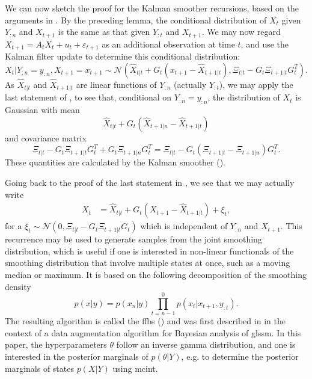 We can now sketch the proof for the Kalman smoother recursions, based on the arguments in \citep[Chapter 7.3]{Chopin2020Introduction}. By the preceding lemma, the conditional distribution of $X_{t}$ given $Y_{:n}$ and $X_{t + 1}$ is the same as that given $Y_{:t}$ and $X_{t + 1}$. 
We may now regard $X_{t + 1} = A_{t}X_{t} + u_{t} + \varepsilon_{t + 1}$ as an additional observation at time $t$, and use the Kalman filter update to determine this conditional distribution:
$$
X_{t} | Y_{:n} = y_{:n}, X_{t + 1} = x_{t+1}\sim \mathcal N \left(\hat X_{t|t} + G_{t}(x_{t + 1} - \hat X_{t + 1 | t}), \Xi_{t |t} - G_{t} \Xi_{t + 1 | t} G_{t}^{T} \right).
$$
As $\hat X_{t|t}$ and $\hat X_{t+1|t}$ are linear functions of $Y_{:n}$ (actually $Y_{:t}$), we may apply the last statement of , to see that, conditional on $Y_{:n} = y_{:n}$, the distribution of $X_{t}$ is Gaussian with mean
$$
\hat X_{t|t} + G_{t} \left( \hat X_{t + 1 | n} - \hat X_{t + 1 | t} \right)
$$
and covariance matrix 
$$
\Xi_{t | t} - G_{t} \Xi_{t + 1|t} G_{t}^{T} + G_{t} \Xi_{t + 1 | n} G_{t}^{T} = \Xi_{t|t} - G_{t} \left( \Xi_{t + 1 | t} - \Xi_{t + 1 | n} \right)G_{t} ^{T}.
$$
These quantities are calculated by the Kalman smoother ().

Going back to the proof of the last statement in , we see that we may actually write
\begin{align}
    \label{eq:kalman-smoother-backwards-recursion}
    X_{t} &= \hat X_{t|t} + G_{t}(X_{t + 1} - \hat X_{t + 1 | t}) + \xi_{t},
\end{align}
for a $\xi_{t} \sim \mathcal N \left( 0, \Xi_{t | t} - G_{t} \Xi_{t + 1|t}G_{t} \right)$ which is independent of $Y_{:n}$ and $X_{t + 1}$.
This recurrence may be used to generate samples from the joint smoothing distribution, which is useful if one is interested in non-linear functionals of the smoothing distribution that involve multiple states at once, such as a moving median or maximum. It is based on the following decomposition of the smoothing density
$$
p(x|y) = p(x_{n}|y) \prod_{t = n - 1}^0 p(x_{t}|x_{t+1}, y_{:t}).
$$
The resulting algorithm is called the \gls{ffbs} () and was first described in \citep{Fruhwirth-Schnatter1994Data} in the context of a data augmentation algorithm for Bayesian analysis of \acrshort{glssm}. In this paper, the hyperparameters $\theta$ follow an inverse gamma distribution, and one is interested in the posterior marginals of $p(\theta|Y)$, e.g. to determine the posterior marginals of states $p(X|Y)$ using \acrshort{mcint}.

